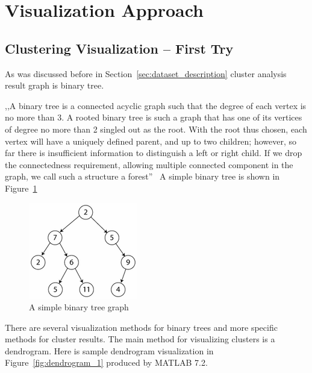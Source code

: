 \section{Visualization Approach}
\label{sec:solution}

\subsection{Clustering Visualization -- First Try}
\label{sec:probe}

As was discussed before in Section~\ref{sec:dataset_description} cluster analysis result graph is binary tree.

,,A binary tree is a connected acyclic graph such that the degree of each vertex is no more than 3. A rooted binary tree is such a graph that has one of its vertices of degree no more than 2 singled out as the root. With the root thus chosen, each vertex will have a uniquely defined parent, and up to two children; however, so far there is insufficient information to distinguish a left or right child. If we drop the connectedness requirement, allowing multiple connected component in the graph, we call such a structure a forest''~\cite{BINARY_TREE} A simple binary tree is shown in Figure~\ref{fig:simple_binary_tree}

\begin{figure}[h!]
\centering
\includegraphics[scale=1.0]{pictures/simple_binary_tree.png}
\caption{A simple binary tree graph}
\label{fig:simple_binary_tree}
\end{figure}

There are several visualization methods for binary trees and more specific methods for cluster results. The main method for visualizing clusters is a dendrogram. Here is sample dendrogram visualization in Figure~\ref{fig:dendrogram_1} produced by MATLAB 7.2.

